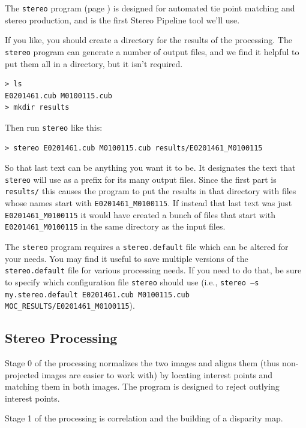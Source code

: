 The \texttt{stereo} program (page \pageref{stereo}) is designed for automated tie 
point matching and stereo production, and is the first Stereo Pipeline tool we'll use.

If you like, you should create a directory for the results of the processing.  The \texttt{stereo} program can generate a number of output files, and we find it helpful to put them all in a directory, but it isn't required.

\begin{verbatim}
> ls
E0201461.cub M0100115.cub
> mkdir results
\end{verbatim}

Then run \texttt{stereo} like this:

\begin{verbatim}
> stereo E0201461.cub M0100115.cub results/E0201461_M0100115
\end{verbatim}

So that last text can be anything you want it to be.  It designates
the text that \texttt{stereo} will use as a prefix for its many
output files.  Since the first part is \texttt{results/} this causes
the program to put the results in that directory with files whose
names start with \texttt{E0201461\_M0100115}.  If instead that last
text was just \texttt{E0201461\_M0100115} it would have created a
bunch of files that start with \texttt{E0201461\_M0100115} in the
same directory as the input files.

The \texttt{stereo} program requires a \texttt{stereo.default} file
which can be altered for your needs. You may find it useful to save
multiple versions of the \texttt{stereo.default} file for various
processing needs. If you need to do that, be sure to specify which
configuration file \texttt{stereo} should use (i.e., \texttt{stereo
–s my.stereo.default E0201461.cub M0100115.cub
MOC\_RESULTS/E0201461\_M0100115}).

\subsection*{Stereo Processing}

Stage 0 of the processing normalizes the two images and aligns them
(thus non-projected images are easier to work with) by locating
interest points and matching them in both images. The program is
designed to reject outlying interest points.

Stage 1 of the processing is correlation and the building of a disparity map. 

